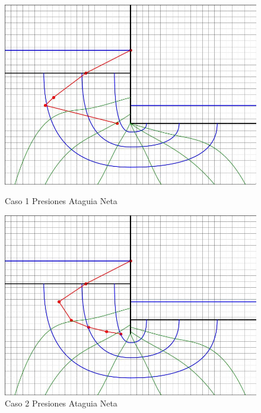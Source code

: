\documentclass{article}
\begin{document}
\begin{figure}[H]
  \centering
  \begin{minipage}{0.32\textwidth}
      \centering
      \includegraphics[width=\textwidth]{FOTOS/caso_1_presion_ataquia_neta.jpg}
      \caption{Caso 1 Presiones Ataguia Neta}
  \end{minipage}
  \begin{minipage}{0.32\textwidth}
      \centering
      \includegraphics[width=\textwidth]{FOTOS/caso_2_presion_ataquia_neta.jpg}
      \caption{Caso 2 Presiones Ataguia Neta}
  \end{minipage}
  \begin{minipage}{0.32\textwidth}
      \centering

\end{minipage}
\end{figure}
\end{document}
